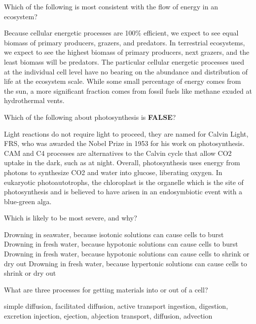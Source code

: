 \documentclass[exam,addpoints]{exam}
\begin{document}
\begin{questions}
\question[1] Which of the following is most consistent with the flow of energy in an ecosystem?
\begin{choices}
\choice Because cellular energetic processes are 100\% efficient, we expect to see equal biomass of primary producers, grazers, and predators.
\CorrectChoice In terrestrial ecosystems, we expect to see the highest biomass of primary producers, next grazers, and the least biomass will be predators.
\choice The particular cellular energetic processes used at the individual cell level have no bearing on the abundance and distribution of life at the ecosystem scale. 
\choice While some small percentage of energy comes from the sun, a more significant fraction comes from fossil fuels like methane exuded at hydrothermal vents. 
\end{choices}

\question[1] Which of the following about photosynthesis is \textbf{FALSE}?
\begin{choices}
\choice Light reactions do not require light to proceed, they are named for Calvin Light, FRS, who was awarded the Nobel Prize in 1953 for his work on photosynthesis.
\choice CAM and C4 processes are alternatives to the Calvin cycle that allow CO2 uptake in the dark, such as at night. 
\choice Overall, photosynthesis uses energy from photons to synthesize CO2 and water into glucose, liberating oxygen. 
\choice In eukaryotic photoautotrophs, the chloroplast is the organelle which is the site of photosynthesis and is believed to have arisen in an endosymbiotic event with a blue-green alga. 
\end{choices}

\question[1] Which is likely to be most severe, and why?
\begin{choices}
\choice Drowning in seawater, because isotonic solutions can cause cells to burst
\choice Drowning in fresh water, because hypotonic solutions can cause cells to burst
\choice Drowning in fresh water, because hypotonic solutions can cause cells to shrink or dry out
\choice Drowning in fresh water, because  hypertonic solutions can cause cells to shrink or dry out
\end{choices}

\question[1] What are three processes for getting materials into or out of a cell?
\begin{choices}
\CorrectChoice simple diffusion, facilitated diffusion, active transport
\choice ingestion, digestion, excretion
\choice injection, ejection, abjection
\choice transport, diffusion, advection
\end{choices}






\end{questions}
\end{document}
